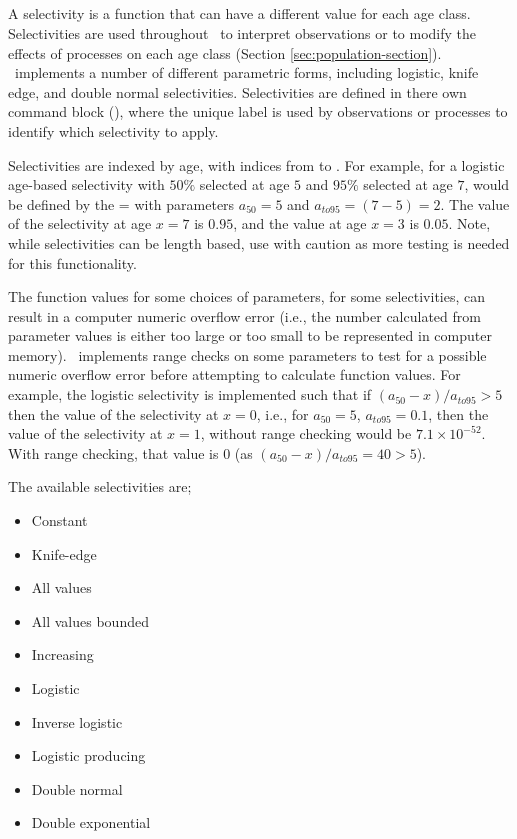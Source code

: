 \subsection{\label{sec:preference_functions}}\textsl{}

\subsection{\label{sec:selectivities}}
A selectivity is a function that can have a different value for each age class. Selectivities are used throughout \IBM\ to interpret observations or to modify the effects of processes on each age class (Section \ref{sec:population-section}). \IBM\ implements a number of different parametric forms, including logistic, knife edge, and double normal selectivities. Selectivities are defined in there own command block (), where the unique label is used by observations or processes to identify which selectivity to apply.

Selectivities are indexed by age, with indices from  to . For example, for a logistic age-based selectivity with $50\%$ selected at age $5$ and $95\%$ selected at age $7$, would be defined by the = with parameters $a_{50}=5$ and $a_{to95}=(7-5)=2$. The value of the selectivity at age $x=7$ is $0.95$, and the value at age $x=3$ is $0.05$. Note, while selectivities can be length based, use with caution as more testing is needed for this functionality.

The function values for some choices of parameters, for some selectivities, can result in a computer numeric overflow error (i.e., the number calculated from parameter values is either too large or too small to be represented in computer memory). \IBM\ implements range checks on some parameters to test for a possible numeric overflow error before attempting to calculate function values. For example, the logistic selectivity is implemented such that if $(a_{50}-x)/a_{to95} > 5$ then the value of the selectivity at $x=0$, i.e., for $a_{50}=5$, $a_{to95}=0.1$, then the value of the selectivity at $x=1$, without range checking would be $7.1 \times 10^{-52}$. With range checking, that value is $0$ (as $(a_{50}-x)/a_{to95}=40 > 5$).

The available selectivities are;

\begin{itemize}
  \item Constant
  \item Knife-edge
  \item All values
  \item All values bounded
  \item Increasing
  \item Logistic
  \item Inverse logistic
  \item Logistic producing
  \item Double normal
  \item Double exponential
\end{itemize}

